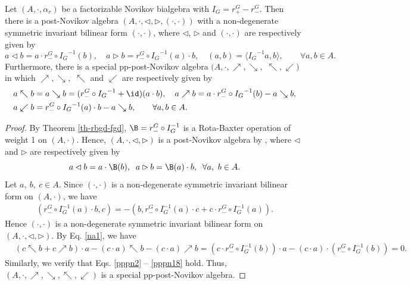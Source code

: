 \documentclass[12pt]{amsart}
\begin{document}
\begin{theorem}\label{th-fn-pna}
Let $(A ,\cdot,\alpha_r)$ be a factorizable Novikov bialgebra with
$I_G=r^G_+-r^G_-$. Then there is a post-Novikov algebra
$(A,\cdot,\lhd,\rhd,(\cdot,\cdot))$ with a non-degenerate  symmetric invariant
bilinear form $(\cdot,\cdot)$, where $\lhd$, $\rhd $ and
$(\cdot,\cdot)$ are respectively given by
$$ a\lhd b=a\cdot r^G_-\circ {I_G}^{-1}(b),\quad  a\rhd b=r^G_-\circ {I_G}^{-1}(a) \cdot b ,\quad   (a,b)=\langle {I_G}^{-1}a,b\rangle,\qquad   \forall  a,b\in A.$$
Furthermore, there is a special pp-post-Novikov algebra
$(A,\cdot,\nearrow,\searrow,$ $\nwarrow,\swarrow)$ in which
$\nearrow,\searrow,$ $\nwarrow$ and $\swarrow$ are respectively
given by
\begin{align*}
    &a\nwarrow b=a\searrow b=(r^G_-\circ {I_G}^{-1}+\id)(a\cdot b),\quad  a\nearrow b= a\cdot r^G_-\circ {I_G}^{-1}(b)-a\searrow b,\\
    &a\swarrow b=r^G_-\circ {I_G}^{-1}(a)\cdot b-a\searrow b , \qquad \forall a,b\in A.
\end{align*}

\end{theorem}
\begin{proof}
By Theorem \ref{th-rbgd-fgd}, $\B=r_-^G\circ I_G^{-1}$ is a
Rota-Baxter operation of weight 1 on $(A,\cdot)$. Hence, $(A,
\cdot ,\lhd,\rhd)$ is a post-Novikov algebra by \cite[Corollary
2.18]{YH}, where $\lhd $ and $\rhd $ are respectively given by
$$a\lhd b=a\cdot \B(b),\;\; a\rhd b=\B(a)\cdot b,\;\;\forall a,~b\in
A.$$ Let $a,~b,~c\in A$. Since $(\cdot,\cdot)$ is a non-degenerate
symmetric invariant bilinear form on $(A,\cdot)$, we have
\begin{align*}
    (  r^G_-\circ I_G^{-1}(a)\cdot b, c )=-( b, r^G_-\circ I_G^{-1}(a)\cdot c+c\cdot  r^G_-\circ I_G^{-1}(a)    ).
\end{align*}
Hence $(\cdot,\cdot)$ is a non-degenerate symmetric invariant
bilinear form on $(A,\cdot,\lhd,\rhd)$.  By Eq. \eqref{na1}, we have
\begin{align*}
&(c\nwarrow b+ c\nearrow b)\cdot a-(c\cdot a )\nwarrow b-(c\cdot a)\nearrow b
=(c\cdot  r_-^G\circ  I_G^{-1}(b))\cdot a-(c\cdot a)\cdot (r_-^G\circ  I_G^{-1}(b))=0.
\end{align*}
Similarly, we verify that Eqs. \eqref{pppn2} -- \eqref{pppn18}
hold. Thus, $(A,\cdot,\nearrow,\searrow,\nwarrow,\swarrow)$ is a
special pp-post-Novikov algebra.
\end{proof}
\end{document}
